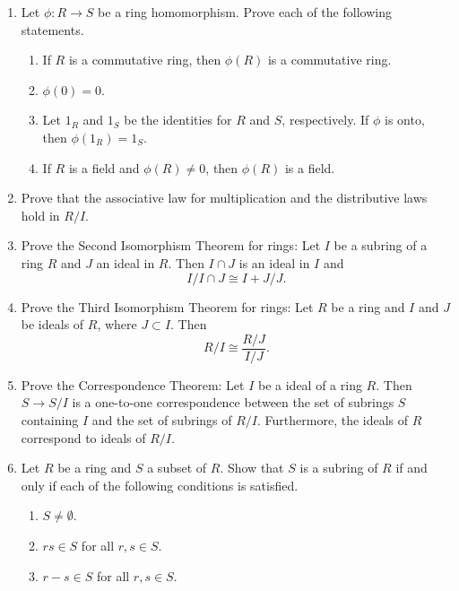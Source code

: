{\begin{enumerate}
  
\item
Let $\phi : R \rightarrow S$ be a ring homomorphism. Prove each of the
following statements. 
\begin{enumerate}
 
 \item
If $R$ is a commutative ring, then $\phi(R)$ is a commutative ring. 
 
 \item
$\phi( 0 ) = 0$.
 
 \item
Let $1_R$ and $1_S$ be the identities for $R$ and $S$, respectively.
If $\phi$ is onto, then $\phi(1_R) = 1_S$. 
 
 \item
If $R$ is a field and $\phi(R) \neq 0$, then $\phi(R)$ is a field.
 
\end{enumerate}
 
 
\item
Prove that the associative law for multiplication and the distributive
laws hold in $R/I$. 
 
 
\item
Prove the Second Isomorphism Theorem for rings: Let $I$ be a  subring
of a ring $R$  and  $J$ an ideal in $R$.  Then $I \cap J$ is an ideal
in $I$ and 
\[
I / I \cap J \cong I + J /J.
\]
 
 
\item
Prove the Third Isomorphism Theorem for rings: Let $R$ be a ring and
$I$ and $J$ be ideals of $R$, where $J \subset I$.  Then
\[
R/I \cong \frac{R/J}{I/J}.
\]
 
 
\item
Prove the Correspondence Theorem:
Let $I$ be a ideal of a ring $R$. Then $S \rightarrow S/I$ is a
one-to-one correspondence between the set of subrings $S$ containing
$I$  and the set of subrings of $R/I$. Furthermore, the ideals
of $R$ correspond to ideals of $R/I$.
 
 
 
\item
Let $R$ be a ring and $S$ a subset of $R$.  Show that $S$ is a subring
of $R$ if and only if each of the following conditions is satisfied. 
\begin{enumerate}
 
 \item
$S \neq \emptyset$. 
 
 \item
$rs \in S$ for all $r, s \in S$.
 
 \item
$r-s \in S$ for all $r, s \in S$.
 

\end{enumerate}
\end{enumerate}}
